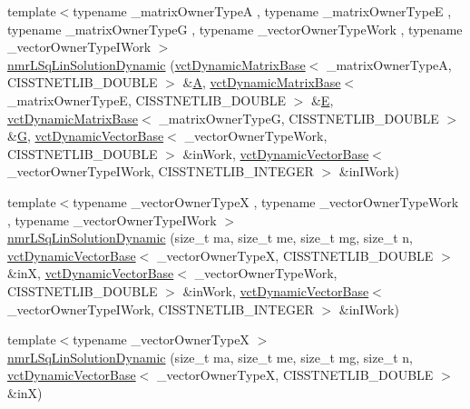\begin{DoxyCompactItemize}
{\footnotesize template$<$typename \-\_\-matrix\-Owner\-Type\-A , typename \-\_\-matrix\-Owner\-Type\-E , typename \-\_\-matrix\-Owner\-Type\-G , typename \-\_\-vector\-Owner\-Type\-Work , typename \-\_\-vector\-Owner\-Type\-I\-Work $>$ }\\\hyperlink{classnmr_l_sq_lin_solution_dynamic_a2345c96cf2cdd3338d72e789eb2e8101}{nmr\-L\-Sq\-Lin\-Solution\-Dynamic} (\hyperlink{classvct_dynamic_matrix_base}{vct\-Dynamic\-Matrix\-Base}$<$ \-\_\-matrix\-Owner\-Type\-A, C\-I\-S\-S\-T\-N\-E\-T\-L\-I\-B\-\_\-\-D\-O\-U\-B\-L\-E $>$ \&\hyperlink{classnmr_l_sq_lin_solution_dynamic_aa4a41abac141e2e55dd5cafb59169dfd}{A}, \hyperlink{classvct_dynamic_matrix_base}{vct\-Dynamic\-Matrix\-Base}$<$ \-\_\-matrix\-Owner\-Type\-E, C\-I\-S\-S\-T\-N\-E\-T\-L\-I\-B\-\_\-\-D\-O\-U\-B\-L\-E $>$ \&\hyperlink{classnmr_l_sq_lin_solution_dynamic_a7c1ac112b07f3edd33d348fe0a40fb71}{E}, \hyperlink{classvct_dynamic_matrix_base}{vct\-Dynamic\-Matrix\-Base}$<$ \-\_\-matrix\-Owner\-Type\-G, C\-I\-S\-S\-T\-N\-E\-T\-L\-I\-B\-\_\-\-D\-O\-U\-B\-L\-E $>$ \&\hyperlink{classnmr_l_sq_lin_solution_dynamic_a399cb314fb848d36f58c14830bad0c28}{G}, \hyperlink{classvct_dynamic_vector_base}{vct\-Dynamic\-Vector\-Base}$<$ \-\_\-vector\-Owner\-Type\-Work, C\-I\-S\-S\-T\-N\-E\-T\-L\-I\-B\-\_\-\-D\-O\-U\-B\-L\-E $>$ \&in\-Work, \hyperlink{classvct_dynamic_vector_base}{vct\-Dynamic\-Vector\-Base}$<$ \-\_\-vector\-Owner\-Type\-I\-Work, C\-I\-S\-S\-T\-N\-E\-T\-L\-I\-B\-\_\-\-I\-N\-T\-E\-G\-E\-R $>$ \&in\-I\-Work)
\item 
{\footnotesize template$<$typename \-\_\-vector\-Owner\-Type\-X , typename \-\_\-vector\-Owner\-Type\-Work , typename \-\_\-vector\-Owner\-Type\-I\-Work $>$ }\\\hyperlink{classnmr_l_sq_lin_solution_dynamic_adb6c95f9d284b937b9c119104369ee25}{nmr\-L\-Sq\-Lin\-Solution\-Dynamic} (size\-\_\-t ma, size\-\_\-t me, size\-\_\-t mg, size\-\_\-t n, \hyperlink{classvct_dynamic_vector_base}{vct\-Dynamic\-Vector\-Base}$<$ \-\_\-vector\-Owner\-Type\-X, C\-I\-S\-S\-T\-N\-E\-T\-L\-I\-B\-\_\-\-D\-O\-U\-B\-L\-E $>$ \&in\-X, \hyperlink{classvct_dynamic_vector_base}{vct\-Dynamic\-Vector\-Base}$<$ \-\_\-vector\-Owner\-Type\-Work, C\-I\-S\-S\-T\-N\-E\-T\-L\-I\-B\-\_\-\-D\-O\-U\-B\-L\-E $>$ \&in\-Work, \hyperlink{classvct_dynamic_vector_base}{vct\-Dynamic\-Vector\-Base}$<$ \-\_\-vector\-Owner\-Type\-I\-Work, C\-I\-S\-S\-T\-N\-E\-T\-L\-I\-B\-\_\-\-I\-N\-T\-E\-G\-E\-R $>$ \&in\-I\-Work)
\item 
{\footnotesize template$<$typename \-\_\-vector\-Owner\-Type\-X $>$ }\\\hyperlink{classnmr_l_sq_lin_solution_dynamic_a41fd124391e7577230d065d8c66885bc}{nmr\-L\-Sq\-Lin\-Solution\-Dynamic} (size\-\_\-t ma, size\-\_\-t me, size\-\_\-t mg, size\-\_\-t n, \hyperlink{classvct_dynamic_vector_base}{vct\-Dynamic\-Vector\-Base}$<$ \-\_\-vector\-Owner\-Type\-X, C\-I\-S\-S\-T\-N\-E\-T\-L\-I\-B\-\_\-\-D\-O\-U\-B\-L\-E $>$ \&in\-X)

\end{DoxyCompactItemize}
